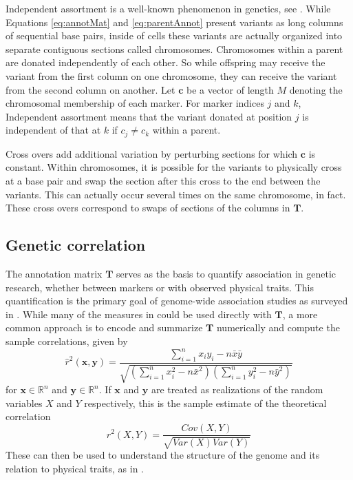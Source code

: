 \documentclass{article}
\newcommand{\ve}[1]{\mathbf{#1}}           %
\newcommand{\m}[1]{\mathbf{#1}}               %
\newcommand{\obscorr}{\widehat{r}^2}
\newcommand{\corr}{r^2}
\newcommand{\field}[1]{\mathbb{#1}}
\newcommand{\Reals}{\field{R}}
\begin{document}
Independent assortment is a well-known phenomenon in genetics, see \cite{siegmundyakir2007}. While Equations \ref{eq:annotMat} and \ref{eq:parentAnnot} present variants as long columns of sequential base pairs, inside of cells these variants are actually organized into separate contiguous sections called chromosomes. Chromosomes within a parent are donated independently of each other. So while offspring may receive the variant from the first column on one chromosome, they can receive the variant from the second column on another. Let $\ve{c}$ be a vector of length $M$ denoting the chromosomal membership of each marker. For marker indices $j$ and $k$, Independent assortment means that the variant donated at position $j$ is independent of that at $k$ if $c_j \neq c_k$ within a parent.

Cross overs add additional variation by perturbing sections for which $\ve{c}$ is constant. Within chromosomes, it is possible for the variants to physically cross at a base pair and swap the section after this cross to the end between the variants. This can actually occur several times on the same chromosome, in fact. These cross overs correspond to swaps of sections of the columns in $\m{T}$.


\subsection{Genetic correlation} \label{subsec:corr}

The annotation matrix $\m{T}$ serves as the basis to quantify association in genetic research, whether between markers or with observed physical traits. This quantification is the primary goal of genome-wide association studies as surveyed in \cite{uffelmannetal2021gwas, tametal2019benefits, wangetal2005gwas}. While many of the measures in \cite{goodmankruskal1979measures} could be used directly with $\m{T}$, a more common approach is to encode and summarize $\m{T}$ numerically and compute the sample correlations, given by
\begin{equation} \label{eq:sampleCorr}
  \obscorr(\ve{x}, \ve{y}) = \frac{\sum_{i = 1}^n x_i y_i - n \bar{x} \bar{y}}{\sqrt{\left (\sum_{i = 1}^n x_i^2 - n \bar{x}^2 \right ) \left (\sum_{i = 1}^n y_i^2 - n \bar{y}^2 \right )}}
\end{equation}
for $\ve{x} \in \Reals^n$ and $\ve{y} \in \Reals^n$. If $\ve{x}$ and $\ve{y}$ are treated as realizations of the random variables $X$ and $Y$ respectively, this is the sample estimate of the theoretical correlation
\begin{equation} \label{eq:theorCorr}
 \corr(X, Y) = \frac{Cov(X, Y)}{\sqrt{Var(X) Var(Y)}}
\end{equation}
These can then be used to understand the structure of the genome and its relation to physical traits, as in \cite{poolr, LiJi2005, nyholt2004, cheverudetal2001}.
\end{document}
